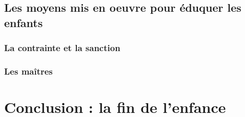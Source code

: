 \documentclass[a4paper, 11pt, hidelinks]{article}
\begin{document}
\subsection{Les moyens mis en oeuvre pour éduquer les enfants}

\subsubsection{La contrainte et la sanction}




\subsubsection{Les maîtres}




\section{Conclusion : la fin de l'enfance}
\end{document}
